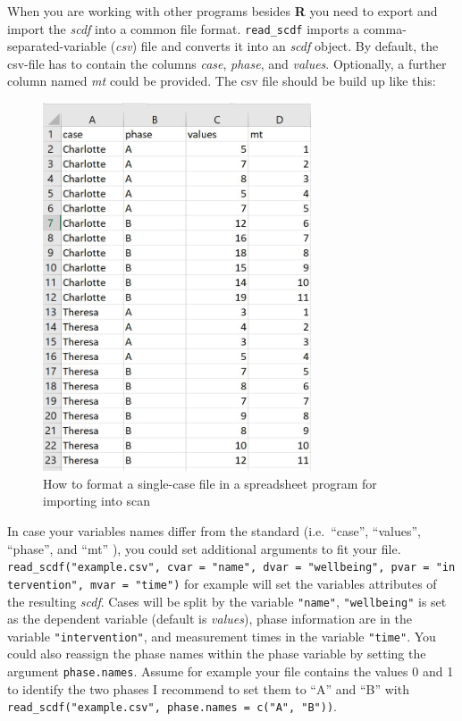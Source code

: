 \documentclass[
  letterpaper,
  DIV=11,
  numbers=noendperiod]{scrreprt}
\begin{document}
When you are working with other programs besides \textbf{R} you need to
export and import the \emph{scdf} into a common file format.
\texttt{read\_scdf} imports a comma-separated-variable (\emph{csv}) file
and converts it into an \emph{scdf} object. By default, the csv-file has
to contain the columns \emph{case}, \emph{phase}, and \emph{values}.
Optionally, a further column named \emph{mt} could be provided. The csv
file should be build up like this:

\begin{figure}

{\centering \includegraphics[width=3.125in,height=\textheight]{./images/readSC.jpg}

}

\caption{\label{fig-spreadsheet}How to format a single-case file in a
spreadsheet program for importing into scan}

\end{figure}

In case your variables names differ from the standard (i.e.~``case'',
``values'', ``phase'', and ``mt'' ), you could set additional arguments
to fit your file.
\texttt{read\_scdf("example.csv",\ cvar\ =\ "name",\ dvar\ =\ "wellbeing",\ pvar\ =\ "intervention",\ mvar\ =\ "time")}
for example will set the variables attributes of the resulting
\emph{scdf}. Cases will be split by the variable \texttt{"name"},
\texttt{"wellbeing"} is set as the dependent variable (default is
\emph{values}), phase information are in the variable
\texttt{"intervention"}, and measurement times in the variable
\texttt{"time"}. You could also reassign the phase names within the
phase variable by setting the argument \texttt{phase.names}. Assume for
example your file contains the values 0 and 1 to identify the two phases
I recommend to set them to ``A'' and ``B'' with
\texttt{read\_scdf("example.csv",\ phase.names\ =\ c("A",\ "B"))}.
\end{document}
